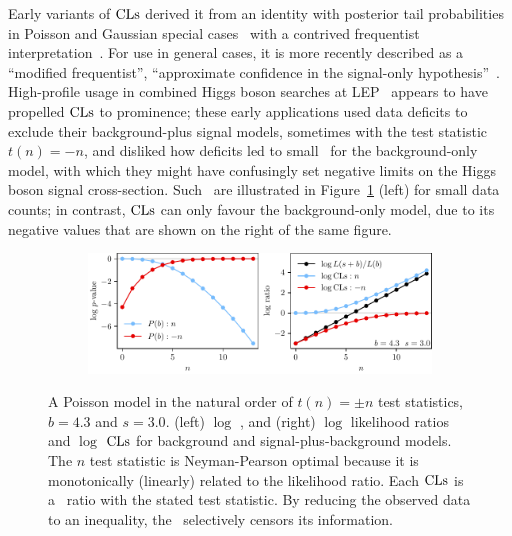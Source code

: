 Early variants of $\mathrm{CLs}$ derived it from an identity with posterior tail
probabilities in Poisson and Gaussian special cases~\cite{
Helene1983upper,
pdg1988,
read2000modified,
pdg2022ynf
}
with a contrived frequentist interpretation~\cite{zech1988cls}.
For use in general cases, it is more recently described as a
``modified frequentist'',
``approximate confidence in the signal-only hypothesis''~\cite{
read2000modified,
Read2002cls
}.
High-profile usage in combined Higgs boson searches at LEP~\cite{
read1997optimal,
bock1998lower,
etde1998prospects,
junk1999confidence,
lep2000searches,
lep2003search
}
appears to have propelled $\mathrm{CLs}$ to prominence;
these early applications used data deficits to exclude their
background-plus signal models, sometimes with the test statistic $t(n) = -n$,
and disliked how deficits led to small \pvalues\ for the background-only model,
with which they might have confusingly set negative limits on the Higgs boson
signal cross-section.
Such \pvalues\ are illustrated in Figure~\ref{fig:searches_sb_n} (left)
for small data counts;
in contrast, $\mathrm{CLs}$ can only favour the background-only model, due to its
negative values that are shown on the right of the same figure.

\begin{figure}[tp]
\centering
\begin{subfigure}{\textwidth}
\centering
\includegraphics[width=\textwidth]{figures/searches_cls_plots_with_pvals_n.pdf}
\end{subfigure}
\caption[
A Poisson model in the natural order
]{%
A Poisson model in the natural order of $t(n) = \pm n$
test statistics, $b = 4.3$ and $s = 3.0$.
(left) $\log$ \pvalues,
and (right) $\log$ likelihood ratios and $\log$ $\mathrm{CLs}$ for
background and signal-plus-background models.
The $n$ test statistic is Neyman-Pearson optimal because it is monotonically
(linearly) related to the likelihood ratio.
Each $\mathrm{CLs}$ is a \pvalue\ ratio with the stated test statistic.
By reducing the observed data to an inequality, the \pvalue\ selectively
censors its information.
}
\label{fig:searches_sb_n}
\end{figure}

